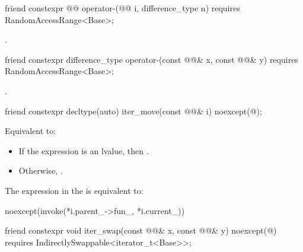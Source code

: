 %
\begin{itemdecl}
friend constexpr @@ operator-(@@ i, difference_type n)
requires RandomAccessRange<Base>;
\end{itemdecl}

\begin{itemdescr}
\pnum
\returns {}.
\end{itemdescr}

%
\begin{itemdecl}
friend constexpr difference_type operator-(const @@& x, const @@& y)
requires RandomAccessRange<Base>;
\end{itemdecl}

\begin{itemdescr}
\pnum
\returns {}.
\end{itemdescr}

\begin{itemdecl}
friend constexpr decltype(auto) iter_move(const @@& i)
noexcept(@\seebelow@);
\end{itemdecl}

\begin{itemdescr}
\pnum
\effects Equivalent to:
\begin{itemize}
\item If the expression  is an lvalue, then
.
\item Otherwise, .
\end{itemize}

\pnum
\remarks The expression in the  is equivalent to:
\begin{codeblock}
noexcept(invoke(*i.parent_->fun_, *i.current_))
\end{codeblock}
\end{itemdescr}

\begin{itemdecl}
friend constexpr void iter_swap(const @@& x, const @@& y)
noexcept(@\seebelow@) requires IndirectlySwappable<iterator_t<Base>>;
\end{itemdecl}

